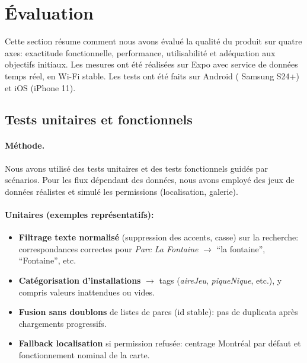 \documentclass[12pt,a4paper]{article}
\begin{document}


\clearpage
\section{Évaluation}

Cette section résume comment nous avons évalué la qualité du produit sur quatre axes: exactitude fonctionnelle, performance, utilisabilité et adéquation aux objectifs initiaux. Les mesures ont été réalisées sur Expo avec service de données temps réel, en Wi-Fi stable. Les tests ont été faits sur Android ( Samsung S24+) et iOS (iPhone 11).

\subsection{Tests unitaires et fonctionnels}

\paragraph{Méthode.}
Nous avons utilisé des tests unitaires et des tests fonctionnels guidés par scénarios. Pour les flux dépendant des données, nous avons employé des jeux de données réalistes et simulé les permissions (localisation, galerie).

\paragraph{Unitaires (exemples représentatifs):}
\begin{itemize}
  \item \textbf{Filtrage texte normalisé} (suppression des accents, casse) sur la recherche: correspondances correctes pour \emph{Parc La Fontaine} \(\rightarrow\) ``la fontaine'', ``Fontaine'', etc.
  \item \textbf{Catégorisation d’installations} \(\rightarrow\) tags (\emph{aireJeu}, \emph{piqueNique}, etc.), y compris valeurs inattendues ou vides.
  \item \textbf{Fusion sans doublons} de listes de parcs (id stable): pas de duplicata après chargements progressifs.
  \item \textbf{Fallback localisation} si permission refusée: centrage Montréal par défaut et fonctionnement nominal de la carte.
\end{itemize}
\end{document}
